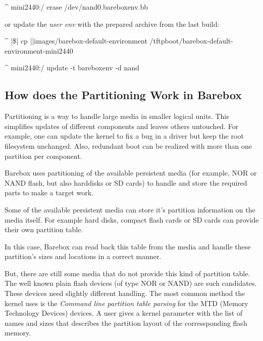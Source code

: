 \begin{ptxshell}[escapechar=|]{^}
mini2440:/ erase /dev/nand0.bareboxenv.bb
\end{ptxshell}

or update the \textit{user env} with the prepared archive from the last build:

\begin{ptxshell}[escapechar=|]{^}
|\$| cp |\ptxdistPlatformDir |images/barebox-default-environment /tftpboot/barebox-default-environment-mini2440
\end{ptxshell}

\begin{ptxshell}[escapechar=|]{^}
mini2440:/ update -t bareboxenv -d nand
\end{ptxshell}



\subsection{How does the Partitioning Work in Barebox}	\label{sec:bbpartitioning}

Partitioning is a way to handle large media in smaller logical units. This
simplifies updates of different components and leaves others untouched. For
example, one can update the kernel to fix a bug in a driver but keep the
root filesystem unchanged. Also, redundant boot can be realized with more than
one partition per component.

%
%

Barebox uses partitioning of the available persistent media (for example, NOR
or NAND flash, but also harddisks or SD cards) to handle and store the
required parts to make a target work.

Some of the available persistent media can store it's partition information on
the media itself. For example hard disks, compact flash cards or SD cards can
provide their own partition table.

In this case, Barebox can read back this table from the media and handle
these partition's sizes and locations in a correct manner.

But, there are still some media that do not provide this kind of partition table.
The well known plain flash devices (of type NOR or NAND) are such candidates.
These devices need slightly different handling. The most common method the
kernel uses is the \textit{Command line partition table parsing} for the MTD
(Memory Technology Devices) devices. A user gives a kernel parameter with the
list of names and sizes that describes the partition layout of the
corressponding flash memory.

